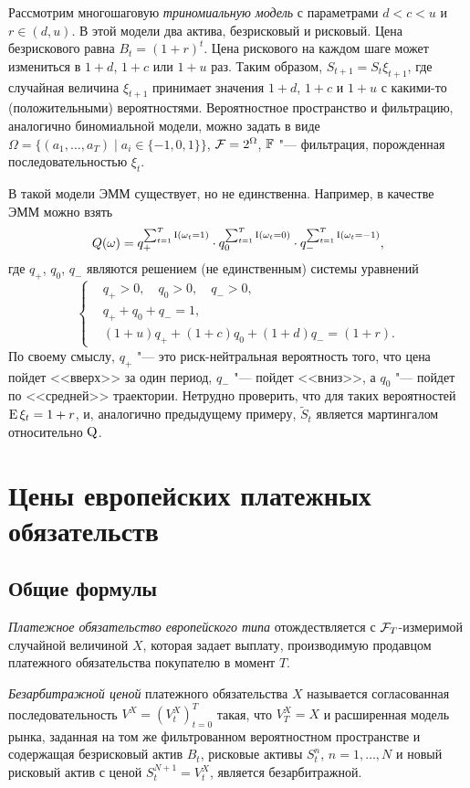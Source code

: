 \begin{example}
Рассмотрим многошаговую \emph{триномиальную модель} с параметрами $d<c<u$ и $r\in(d,u)$.
В этой модели два актива, безрисковый и рисковый.
Цена безрискового равна $B_t = (1+r)^t$.
Цена рискового на каждом шаге может измениться в $1+d$, $1+c$ или $1+u$ раз.
Таким образом, $S_{t+1} = S_t\xi_{t+1}$, где случайная величина $\xi_{t+1}$ принимает значения $1+d$, $1+c$ и $1+u$ с какими-то (положительными) вероятностями.
Вероятностное пространство и фильтрацию, аналогично биномиальной модели, можно задать в виде $\Omega = \{(a_1,\dots,a_T) \mid a_i\in\{-1,0,1\}\}$, $\mathcal{F} = 2^\Omega$, $\mathbb{F}$ "--- фильтрация, порожденная последовательностью $\xi_t$. 

В такой модели ЭММ существует, но не единственна.
Например, в качестве ЭММ можно взять
\[
Q(\omega) = q_+^{\sum_{t=1}^T \operatorname{I}(\omega_t=1)} 
\cdot q_0^{\sum_{t=1}^T \operatorname{I}(\omega_t=0)} 
\cdot q_-^{\sum_{t=1}^T \operatorname{I}(\omega_t=-1)},
\]
где $q_+$, $q_0$, $q_-$ являются решением (не единственным) системы уравнений
\[
\left\{\begin{aligned}
  &q_+>0,\quad q_0>0,\quad q_- > 0,\\
  &q_++q_0+q_- = 1,\\
  &(1+u)q_+ + (1+c)q_0 + (1+d) q_- = (1+r).
\end{aligned}
\right.
\]
По своему смыслу, $q_+$ "--- это риск-нейтральная вероятность того, что цена пойдет <<вверх>> за один период, $q_-$ "--- пойдет <<вниз>>, а $q_0$ "--- пойдет по <<средней>> траектории.
Нетрудно проверить, что для таких вероятностей $\operatorname{E} \xi_t = 1+r$, и, аналогично предыдущему примеру,  $\tilde S_t$ является мартингалом относительно $\mathrm{Q}$.
\end{example}


\section{Цены европейских платежных обязательств}
\subsection{Общие формулы}

\begin{definition}
\emph{Платежное обязательство европейского типа} отождествляется с $\mathcal{F}_T$-измеримой случайной величиной $X$, которая задает выплату, производимую продавцом платежного обязательства покупателю в момент $T$.
\end{definition}

\begin{definition}
\emph{Безарбитражной ценой} платежного обязательства $X$ называется согласованная последовательность $V^X = (V_t^X)_{t=0}^T$ такая, что $V_T^X = X$ и расширенная модель рынка, заданная на том же фильтрованном вероятностном пространстве и содержащая безрисковый актив $B_t$, рисковые активы $S_t^n$, $n=1,\dots,N$ и новый рисковый актив с ценой $S_t^{N+1} = V_t^X$, является безарбитражной.
\end{definition}

